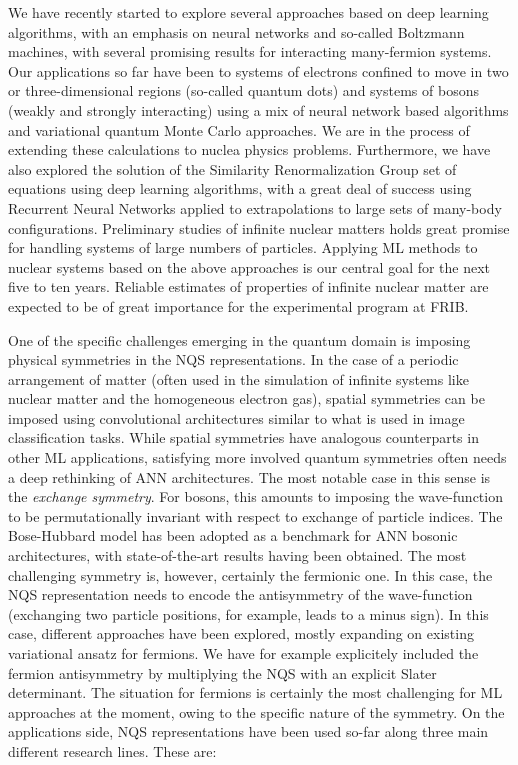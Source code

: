 \documentclass[%
oneside,                 %
final,                   %
10pt]{article}
\begin{document}
We have recently started to explore several approaches based on deep
learning algorithms, with an emphasis on neural networks and so-called
Boltzmann machines, with several promising results for interacting
many-fermion systems. Our applications
so far have been to systems of electrons confined to move in two or
three-dimensional regions (so-called quantum dots) and systems of
bosons (weakly and strongly interacting) using a mix of neural network
based algorithms and variational quantum Monte Carlo approaches. We are in the process of extending these calculations
to nuclea physics problems. 
Furthermore, we have also explored the solution of the Similarity
Renormalization Group set of equations using deep learning algorithms, with a great deal of success using Recurrent Neural Networks
applied to extrapolations to large sets of many-body configurations. Preliminary studies of infinite nuclear matters holds great promise for handling systems of large numbers of particles.
Applying ML methods to nuclear systems based on the above
approaches is our central goal for the next five to ten years.  Reliable estimates of properties of infinite nuclear matter are expected to be of great importance for the experimental program at FRIB.

One of the specific challenges emerging in the quantum domain is
imposing physical symmetries in the NQS representations. In the case
of a periodic arrangement of matter (often used in the simulation of
infinite systems like nuclear matter and the homogeneous electron
gas), spatial symmetries can be imposed using convolutional
architectures similar to what is used in image classification tasks.
While spatial symmetries have analogous counterparts in other ML
applications, satisfying more involved quantum symmetries often needs
a deep rethinking of ANN architectures.  The most notable case in this
sense is the \emph{exchange symmetry}.  For bosons, this amounts to
imposing the wave-function to be permutationally invariant with
respect to exchange of particle indices. The Bose-Hubbard model has
been adopted as a benchmark for ANN bosonic architectures, with
state-of-the-art results having been obtained.  The most challenging
symmetry is, however, certainly the fermionic one.  In this case, the
NQS representation needs to encode the antisymmetry of the
wave-function (exchanging two particle positions, for example, leads
to a minus sign). In this case, different approaches have been
explored, mostly expanding on existing variational ansatz for
fermions. We have for example explicitely included the fermion
antisymmetry by multiplying the NQS with an explicit Slater
determinant.  The situation for fermions is certainly the most
challenging for ML approaches at the moment, owing to the specific
nature of the symmetry.  On the applications side, NQS representations
have been used so-far along three main different research lines. These
are:
\end{document}

